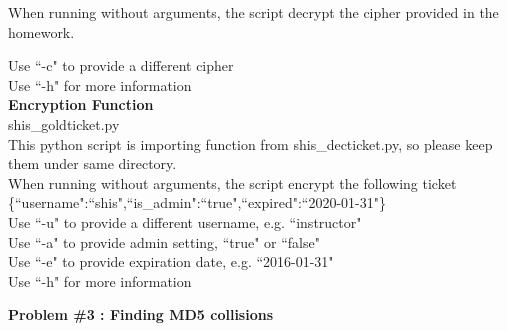 \documentclass[12pt]{article}  %
\begin{document}
\medskip
When running without arguments, the script decrypt the cipher provided in the
homework.

Use ``-c" to provide a different cipher\\
Use ``-h" for more information\\
\bigskip
{\bf Encryption Function}\\
\medskip
shis\_goldticket.py\\
\medskip
This python script is importing function from shis\_decticket.py,
so please keep them under same directory.\\
\medskip
When running without arguments, the script encrypt the following ticket
\{``username":``shis",``is\_admin":``true",``expired":``2020-01-31"\}\\
\medskip
Use ``-u" to provide a different username, e.g. ``instructor"\\
Use ``-a" to provide admin setting, ``true" or ``false"\\
Use ``-e" to provide expiration date, e.g. ``2016-01-31"\\
Use ``-h" for more information\\

%
%
\newpage
\begin{center}
\textbf{Problem \#3 : Finding MD5 collisions}
\end{center}
\end{document}
